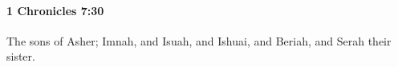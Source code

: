 
		\paragraph{1 Chronicles 7:30} %
			\label{1CHRONICLES-7-30}

			The sons of Asher; Imnah, and Isuah, and Ishuai, and Beriah, and Serah their sister.


